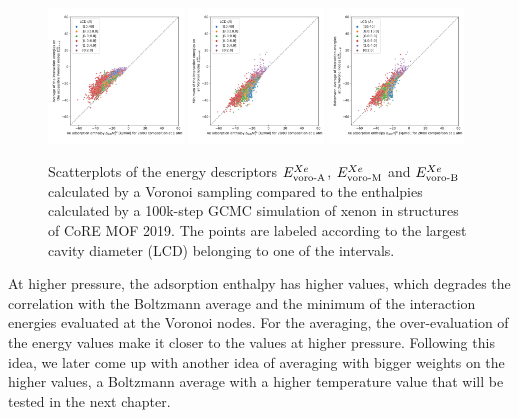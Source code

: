 \documentclass[main]{subfiles}
\begin{document}
\begin{figure}[ht]
    \centering
      \includegraphics[width=0.32\textwidth]{figures/3-fastsim/H_Xe_2080_vs_E_voro_A_overview.jpg}
      \includegraphics[width=0.32\textwidth]{figures/3-fastsim/H_Xe_2080_vs_E_voro_M_overview.jpg}
      \includegraphics[width=0.32\textwidth]{figures/3-fastsim/H_Xe_2080_vs_E_voro_B_overview.jpg}
      \caption{Scatterplots of the energy descriptors $E_{\text{voro-A}}^{Xe}$, $E_{\text{voro-M}}^{Xe}$ and $E_{\text{voro-B}}^{Xe}$ calculated by a Voronoi sampling compared to the enthalpies calculated by a 100k-step GCMC simulation of xenon in structures of CoRE MOF 2019. The points are labeled according to the largest cavity diameter (LCD) belonging to one of the intervals.}\label{fgr:compa_voro_2080}
  \end{figure}
  
At higher pressure, the adsorption enthalpy has higher values, which degrades the correlation with the Boltzmann average and the minimum of the interaction energies evaluated at the Voronoi nodes. For the averaging, the over-evaluation of the energy values make it closer to the values at higher pressure. Following this idea, we later come up with another idea of averaging with bigger weights on the higher values, a Boltzmann average with a higher temperature value that will be tested in the next chapter. 
\end{document}
